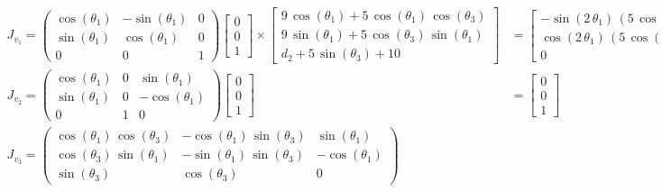 \documentclass[11pt]{article}
\begin{document}
\begin{align*}
    J_{v_1}=
\left(\begin{array}{ccc} \cos\left(\theta _{1}\right) & -\sin\left(\theta _{1}\right) & 0\\ \sin\left(\theta _{1}\right) & \cos\left(\theta _{1}\right) & 0\\ 0 & 0 & 1 \end{array}\right)
\begin{bmatrix}0 \\ 0 \\ 1 \end{bmatrix}
\times
\begin{bmatrix}
9\,\cos\left(\theta _{1}\right)+5\,\cos\left(\theta _{1}\right)\,\cos\left(\theta _{3}\right)\\ 
9\,\sin\left(\theta _{1}\right)+5\,\cos\left(\theta _{3}\right)\,\sin\left(\theta _{1}\right)\\ 
d_{2}+5\,\sin\left(\theta _{3}\right)+10
\end{bmatrix}
    &=
\begin{bmatrix}
-\sin\left(2\,\theta _{1}\right)\,\left(5\,\cos\left(\theta _{3}\right)+9\right)\\ \cos\left(2\,\theta _{1}\right)\,\left(5\,\cos\left(\theta _{3}\right)+9\right)\\ 0
\end{bmatrix}
\\
J_{v_2}=
\left(\begin{array}{ccc} \cos\left(\theta _{1}\right) & 0 & \sin\left(\theta _{1}\right)\\ \sin\left(\theta _{1}\right) & 0 & -\cos\left(\theta _{1}\right)\\ 0 & 1 & 0 \end{array}\right)
\begin{bmatrix}0 \\ 0 \\ 1 \end{bmatrix}
    &=
\begin{bmatrix}
    0\\0\\1
\end{bmatrix}
\\
J_{v_3}=
\left(\begin{array}{ccc} \cos\left(\theta _{1}\right)\,\cos\left(\theta _{3}\right) & -\cos\left(\theta _{1}\right)\,\sin\left(\theta _{3}\right) & \sin\left(\theta _{1}\right)\\ \cos\left(\theta _{3}\right)\,\sin\left(\theta _{1}\right) & -\sin\left(\theta _{1}\right)\,\sin\left(\theta _{3}\right) & -\cos\left(\theta _{1}\right)\\ \sin\left(\theta _{3}\right) & \cos\left(\theta _{3}\right) & 0 \end{array}\right)

\end{align*}
\end{document}
